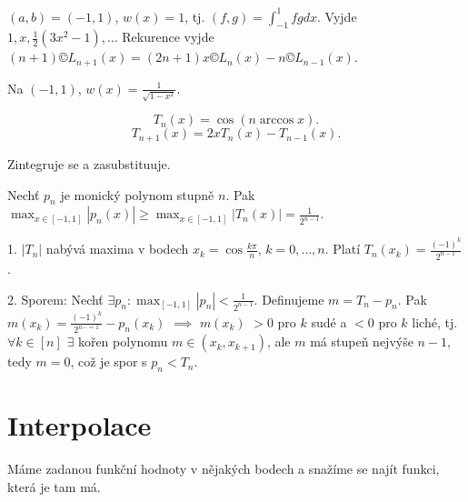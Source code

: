\documentclass[12pt]{article}					%
\begin{document}
\begin{definice}
	$(a, b) = (-1, 1)$, $w(x) = 1$, tj. $(f, g) = \int_{-1}^1 f g dx$. Vyjde $1, x, \frac{1}{2}(3x^2 - 1), …$ Rekurence vyjde $(n+1) ©L_{n+1}(x) = (2n+1)x ©L_n(x) - n©L_{n-1}(x)$.
\end{definice}

\begin{definice}
	Na $(-1, 1)$, $w(x) = \frac{1}{\sqrt{1 - x^2}}$.

	$$ T_n(x) = \cos(n \arccos x). $$
	$$ T_{n+1}(x) = 2x T_n(x) - T_{n-1}(x). $$

	\begin{dukazin}[Ortogonalita]
		Zintegruje se a zasubstituuje.
	\end{dukazin}
\end{definice}

\begin{veta}
	Nechť $p_n$ je monický polynom stupně $n$. Pak $\max_{x \in [-1, 1]}|p_n(x)| ≥ \max_{x \in [-1, 1]} |T_n(x)| = \frac{1}{2^{n-1}}$.

	\begin{dukazin}
		1. $|T_n|$ nabývá maxima v bodech $x_k = \cos \frac{k\pi}{n}$, $k = 0, …, n$. Platí $T_n(x_k) = \frac{(-1)^k}{2^{n-1}}$.

		2. Sporem: Nechť $\exists p_n: \max_{[-1, 1]} |p_n| < \frac{1}{2^{n-1}}$. Definujeme $m = T_n - p_n$. Pak $m(x_k) = \frac{(-1)^k}{2^{n-=1}} - p_n(x_k)$ $\implies$ $m(x_k)$ $>0$ pro $k$ sudé a $<0$ pro $k$ liché, tj. $\forall k \in [n]$ $\exists$ kořen polynomu $m \in (x_k, x_{k+1})$, ale $m$ má stupeň nejvýše $n - 1$, tedy $m=0$, což je spor s $p_n < T_n$.
	\end{dukazin}
\end{veta}


\section{Interpolace}
\begin{definice}[Interpolace]
	Máme zadanou funkční hodnoty v nějakých bodech a snažíme se najít funkci, která je tam má.
\end{definice}
\end{document}
